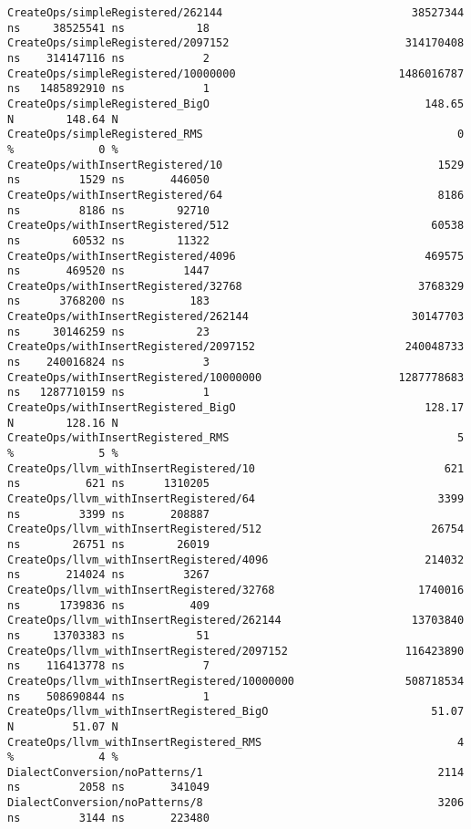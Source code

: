 \begin{code}
\begin{verbatim}
CreateOps/simpleRegistered/262144                             38527344 ns     38525541 ns           18
CreateOps/simpleRegistered/2097152                           314170408 ns    314147116 ns            2
CreateOps/simpleRegistered/10000000                         1486016787 ns   1485892910 ns            1
CreateOps/simpleRegistered_BigO                                 148.65 N        148.64 N
CreateOps/simpleRegistered_RMS                                       0 %             0 %
CreateOps/withInsertRegistered/10                                 1529 ns         1529 ns       446050
CreateOps/withInsertRegistered/64                                 8186 ns         8186 ns        92710
CreateOps/withInsertRegistered/512                               60538 ns        60532 ns        11322
CreateOps/withInsertRegistered/4096                             469575 ns       469520 ns         1447
CreateOps/withInsertRegistered/32768                           3768329 ns      3768200 ns          183
CreateOps/withInsertRegistered/262144                         30147703 ns     30146259 ns           23
CreateOps/withInsertRegistered/2097152                       240048733 ns    240016824 ns            3
CreateOps/withInsertRegistered/10000000                     1287778683 ns   1287710159 ns            1
CreateOps/withInsertRegistered_BigO                             128.17 N        128.16 N
CreateOps/withInsertRegistered_RMS                                   5 %             5 %
CreateOps/llvm_withInsertRegistered/10                             621 ns          621 ns      1310205
CreateOps/llvm_withInsertRegistered/64                            3399 ns         3399 ns       208887
CreateOps/llvm_withInsertRegistered/512                          26754 ns        26751 ns        26019
CreateOps/llvm_withInsertRegistered/4096                        214032 ns       214024 ns         3267
CreateOps/llvm_withInsertRegistered/32768                      1740016 ns      1739836 ns          409
CreateOps/llvm_withInsertRegistered/262144                    13703840 ns     13703383 ns           51
CreateOps/llvm_withInsertRegistered/2097152                  116423890 ns    116413778 ns            7
CreateOps/llvm_withInsertRegistered/10000000                 508718534 ns    508690844 ns            1
CreateOps/llvm_withInsertRegistered_BigO                         51.07 N         51.07 N
CreateOps/llvm_withInsertRegistered_RMS                              4 %             4 %
DialectConversion/noPatterns/1                                    2114 ns         2058 ns       341049
DialectConversion/noPatterns/8                                    3206 ns         3144 ns       223480

\end{verbatim}
\end{code}

